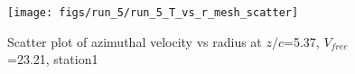 \begin{figure}[H]
\centering
\texttt{[image: figs/run\_5/run\_5\_T\_vs\_r\_mesh\_scatter]}
\caption{Scatter plot of azimuthal velocity vs radius at $z/c$=5.37, $V_{free}$=23.21, station1}
\label{fig:run_5_T_vs_r_mesh_scatter}
\end{figure}



